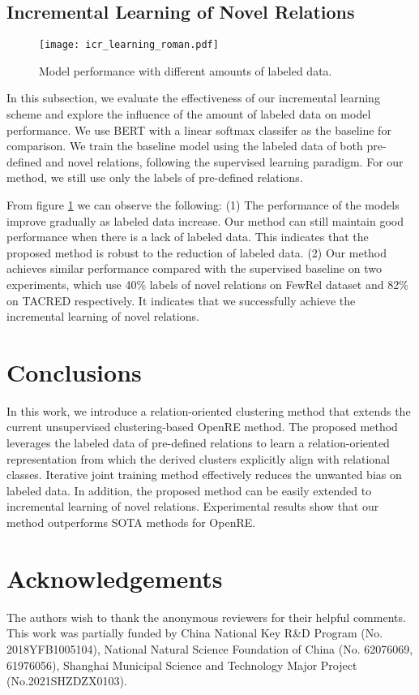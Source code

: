 \documentclass[11pt]{article}
\begin{document}
    \subsection{Incremental Learning of Novel Relations}
        \begin{figure}[t]
            \texttt{[image: icr\_learning\_roman.pdf]}
            \caption{Model performance with different amounts of labeled data.}
            \label{fig:icr_learning}
        \end{figure}
        In this subsection, we evaluate the effectiveness of our incremental learning scheme and explore the influence of the amount of labeled data on model performance. We use BERT with a linear softmax classifer as the baseline for comparison. We train the baseline model using the labeled data of both pre-defined and novel relations, following the supervised learning paradigm. For our method, we still use only the labels of pre-defined relations. 



        From figure \ref{fig:icr_learning} we can observe the following: (1) The performance of the models improve gradually as labeled data increase. Our method can still maintain good performance when there is a lack of labeled data. This indicates that the proposed method is robust to the reduction of labeled data. (2) Our method achieves similar performance compared with the supervised baseline on  two experiments, which use 40\% labels of novel relations on FewRel dataset and 82\% on TACRED respectively. It indicates that we successfully achieve the incremental learning of novel relations.
        
    
\section{Conclusions}
    In this work, we introduce a relation-oriented clustering method that extends the current unsupervised clustering-based OpenRE method. The proposed method leverages the labeled data of pre-defined relations to learn a relation-oriented representation from which the derived clusters explicitly align with relational classes. Iterative joint training method effectively reduces the unwanted bias on labeled data.
In addition, the proposed method can be easily extended to incremental learning of novel relations. Experimental results show that our method outperforms SOTA methods for OpenRE.
    
\section*{Acknowledgements}
The authors wish to thank the anonymous reviewers for their helpful comments. This work was partially funded by China National Key R\&D Program (No. 2018YFB1005104), National Natural Science Foundation of China (No.  62076069, 61976056), Shanghai Municipal Science and Technology Major Project (No.2021SHZDZX0103).
\end{document}
